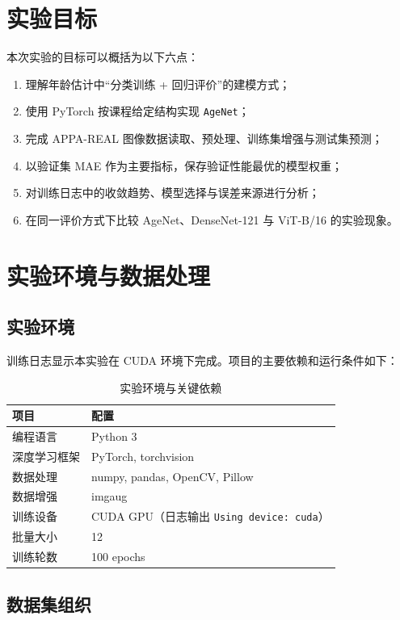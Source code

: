 \documentclass[12pt,a4paper,fontset=fandol]{ctexart}
\begin{document}
\section{实验目标}

本次实验的目标可以概括为以下六点：
\begin{enumerate}
  \item 理解年龄估计中“分类训练 + 回归评价”的建模方式；
  \item 使用 PyTorch 按课程给定结构实现 \texttt{AgeNet}；
  \item 完成 APPA-REAL 图像数据读取、预处理、训练集增强与测试集预测；
  \item 以验证集 MAE 作为主要指标，保存验证性能最优的模型权重；
  \item 对训练日志中的收敛趋势、模型选择与误差来源进行分析；
  \item 在同一评价方式下比较 AgeNet、DenseNet-121 与 ViT-B/16 的实验现象。
\end{enumerate}

\section{实验环境与数据处理}

\subsection{实验环境}

训练日志显示本实验在 CUDA 环境下完成。项目的主要依赖和运行条件如下：

\begin{table}[H]
  \centering
  \caption{实验环境与关键依赖}
  \begin{tabular}{ll}
    \toprule
    项目 & 配置 \\
    \midrule
    编程语言 & Python 3 \\
    深度学习框架 & PyTorch, torchvision \\
    数据处理 & numpy, pandas, OpenCV, Pillow \\
    数据增强 & imgaug \\
    训练设备 & CUDA GPU（日志输出 \texttt{Using device: cuda}） \\
    批量大小 & 12 \\
    训练轮数 & 100 epochs \\
    \bottomrule
  \end{tabular}
\end{table}

\subsection{数据集组织}
\end{document}
